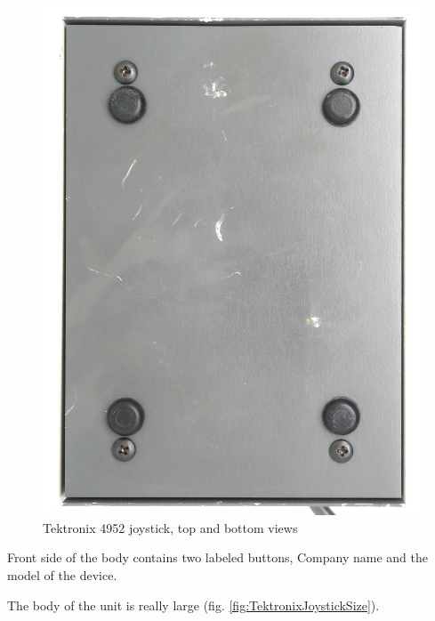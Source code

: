 \documentclass[11pt, a4paper]{article}
\begin{document}
\begin{figure}[h]
    \includegraphics[scale=0.3]{1975_Tektronix_4952_Joystick/bottom_30.jpg}
    \caption{Tektronix 4952 joystick, top and bottom views}
    \label{fig:TektronixJoystickTopAndBottom}
\end{figure}

Front side of the body contains two labeled buttons, Company name and the model of the device.

The body of the unit is really large (fig. \ref{fig:TektronixJoystickSize}).
\end{document}
